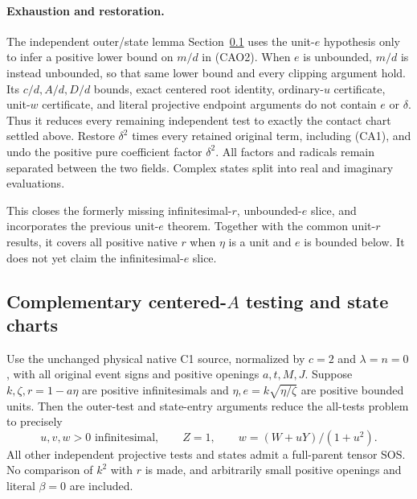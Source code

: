\paragraph{Exhaustion and restoration.}
The independent outer/state lemma Section~\ref{component:p364e14238053}
uses the unit-$e$ hypothesis only to infer a positive lower bound on
$m/d$ in (CAO2). When $e$ is unbounded, $m/d$ is instead unbounded,
so that same lower bound and every clipping argument hold. Its
$c/d,A/d,D/d$ bounds, exact centered root identity, ordinary-$u$
certificate, unit-$w$ certificate, and literal projective endpoint
arguments do not contain $e$ or $\delta$. Thus it reduces every
remaining independent test to exactly the contact chart settled above.
Restore $\delta^2$ times every retained original term, including
(CA1), and undo the positive pure coefficient factor $\delta^2$.
All factors and radicals remain separated between the two fields.
Complex states split into real and imaginary evaluations.

This closes the formerly missing infinitesimal-$r$, unbounded-$e$
slice, and incorporates the previous unit-$e$ theorem. Together with
the common unit-$r$ results, it covers all positive native $r$
when $\eta$ is a unit and $e$ is bounded below. It does not yet
claim the infinitesimal-$e$ slice.



\subsection{Complementary centered-$A$ testing and state charts}

\label{component:p364e14238053}

\label{p364e14238053:sec:centered-a-outer}

\begin{lemma}
Use the unchanged physical native C1 source, normalized by $c=2$ and
$\lambda=n=0$, with all original event signs and positive openings
$a,t,M,J$. Suppose $k,\zeta,r=1-a\eta$ are positive infinitesimals and
$\eta,e=k\sqrt{\eta/\zeta}$ are positive bounded units.
Then the outer-test and state-entry arguments reduce the all-tests
problem to precisely
\[
 u,v,w>0\text{ infinitesimal},\qquad Z=1,
 \qquad w=(W+uY)/(1+u^2).
 \tag{CAO1}
\]
All other independent projective tests and states admit a full-parent
tensor SOS. No comparison of $k^2$ with $r$ is made, and arbitrarily
small positive openings and literal $\beta=0$ are included.
\end{lemma}


